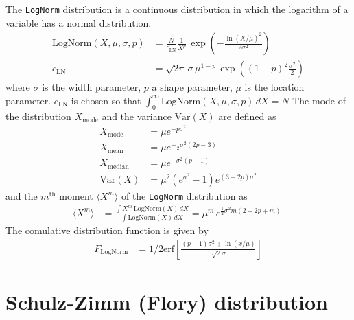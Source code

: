 The \texttt{LogNorm} distribution is a continuous distribution in
which the logarithm of a variable has a normal distribution.
\begin{subequations}
\begin{align}
\text{LogNorm}(X,\mu,\sigma,p) &=  \frac{N}{c_\text{LN}}
                                    \frac{1}{X^{p}}\,
                                    \exp\!\!\left(-\frac{\ln(X/\mu)^2}{2\sigma^2}\right) \\
c_\text{LN} &= \sqrt{2\pi}\,\sigma \,\mu^{1-p}
\,\exp\!\!\left((1-p)^2\frac{\sigma^2}{2}\right)
\label{eq:LogNormal}
\end{align}
\end{subequations}
where $\sigma$ is the width parameter, $p$ a shape parameter, $\mu$ is the location parameter.
$c_\text{LN}$ is chosen so that $\int_0^\infty\! \text{LogNorm}(X,\mu,\sigma,p)\,dX = N$
The mode of the distribution $X_\text{mode}$ and the variance
$\text{Var}(X)$ are defined as
\begin{align}
X_\text{mode} &= \mu e^{-p \sigma^2} \\
X_\text{mean} &= \mu e^{-\frac{1}{2}\sigma^2 \left(2p-3\right)} \\
X_\text{median} &= \mu e^{-\sigma^2 \left(p-1\right)} \\
\text{Var}(X) &= \mu ^2 \left(e^{\sigma^2}-1\right) e^{(3-2 p) \sigma^2}
\end{align}
and the $m^\text{th}$ moment $\langle X^m\rangle$ of the \texttt{LogNorm} distribution as
\begin{align}
\langle X^m\rangle &= \frac{\int X^m\, \textrm{LogNorm}(X)\, dX}{\int \textrm{LogNorm}(X)\, dX} =
\mu^m \, e^{\frac{1}{2} \sigma^2 m (2 - 2 p + m)}.
\label{eq:nMoment:LogNormal}
\end{align}
The comulative distribution function is given by
\begin{align}
F_\textrm{LogNorm} &=
1/2 \textrm{erf}\left[\frac{(p-1) \sigma^2 + \ln(x/\mu)}{\sqrt{2} \sigma}\right]
\end{align}

\clearpage
\section{Schulz-Zimm (Flory) distribution}
\label{sec:SchulzZimm}

